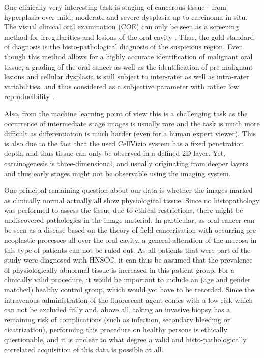 \documentclass[fleqn,10pt]{wlscirep}
\begin{document}
One clinically very interesting task is staging of cancerous tissue - from hyperplasia over mild, moderate and severe dysplasia up
to carcinoma in situ\cite{Keith:2013jm}. 
The visual clinical oral examination (COE) can only be seen as a screening method for irregularities and lesions of the oral cavity \cite{Cleveland:2013gc}.
Thus, the gold standard of diagnosis is the histo-pathological diagnosis of the suspicious region. Even though this method allows for a highly accurate identification of malignant oral tissue, a grading of the oral cancer as well as the identification of pre-malignant lesions and cellular dysplasia is still subject to inter-rater as well as intra-rater variabilities. and thus considered as a subjective parameter with rather low reproducibility \cite{Abbey:1995kd}.

Also, from the machine learning point of view this is a challenging task as the occurrence of intermediate stage images is usually rare and the task is much more difficult as differentiation is much harder (even for a human expert viewer). This is also due to the fact that the used CellVizio system has a fixed penetration depth, and thus tissue can only be observed in a defined 2D layer. Yet, carcinogenesis is three-dimensional, and usually originating from deeper layers and thus early stages might not be observable using the imaging system.

One principal remaining question about our data is whether the images marked as clinically normal actually all show physiological tissue.  Since no histopathology was performed to assess the tissue due to ethical restrictions, there might be undiscovered pathologies in the image material. In particular, as oral cancer can be seen as a disease based on the theory of field cancerisation with occurring pre-neoplastic processes all over the oral cavity, a general alteration of the mucosa in this type of patients can not be ruled out. As all patients that were part of the study were diagnosed with HNSCC, it can thus be assumed that the prevalence of physiologically abnormal tissue is increased in this patient group. For a clinically valid procedure, it would be important to include an (age and gender matched) healthy control group, which would yet have to be recorded. Since the intravenous administration of the fluorescent agent comes with a low risk which can not be excluded fully and, above all, taking an invasive biopsy has a remaining risk of complications (such as infection, secondary bleeding or cicatrization), performing this procedure on healthy persons is ethically questionable, and it is unclear to what degree a valid and histo-pathologically correlated acquisition of this data is possible at all. 
\end{document}
